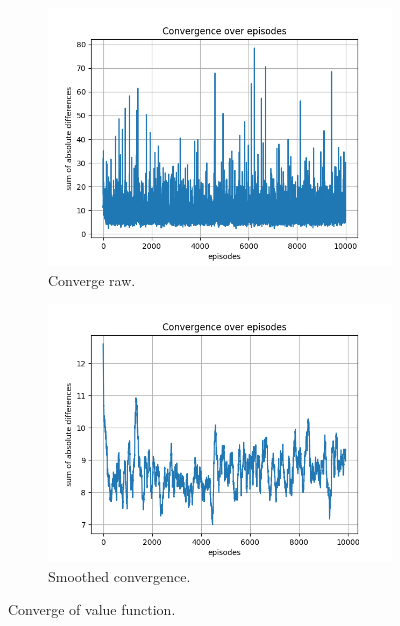 \documentclass{assignment}
\begin{document}
\begin{figure}[H]
    \begin{subfigure}{0.5\textwidth}
        \includegraphics[width=\textwidth]{figures/convergence_td/epsilon_sweep/convergence_TD_alpha_0.1_gamma_0.95_epislon_0.0.png}
    \caption{Converge raw.}
    \end{subfigure}\hfill
    \begin{subfigure}{0.5\textwidth}
        \includegraphics[width=\textwidth]{figures/convergence_td/epsilon_sweep/convergence_TD_smoothed_alpha_0.1_gamma_0.95_epislon_0.0.png}
    \caption{Smoothed convergence.}
    \end{subfigure}
    \caption{Converge of value function.}
    \label{fig:epsilon_0.0_td_learning_convergence}
\end{figure}
\end{document}
